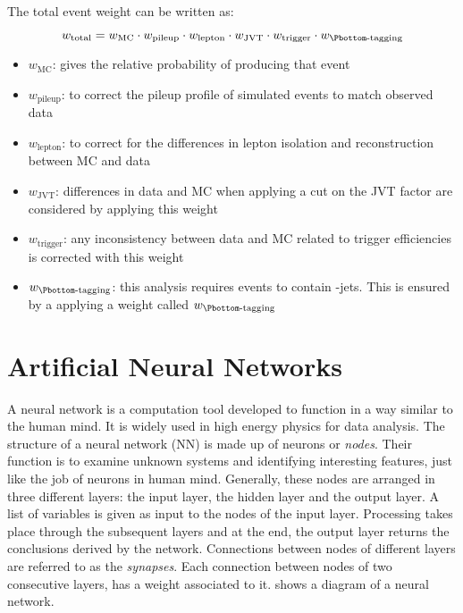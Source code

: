 The total event weight can be written as:

\begin{equation}
  w_{\text{total}} = w_{\text{MC}} \cdot w_{\text{pileup}} \cdot w_{\text{lepton}} \cdot w_{\text{JVT}} \cdot w_{\text{trigger}} \cdot w_{\text{\Pbottom-tagging}}
\end{equation}


\begin{itemize}
  \item $w_{\text{MC}}$: gives the relative probability of producing that event
  \item $w_\text{pileup}$: to correct the pileup profile of simulated events to match observed data
  \item $w_{\text{lepton}}$: to correct for the differences in lepton isolation and reconstruction between
  MC and data
  \item $w_{\text{JVT}}$: differences in data and MC when applying a cut on the JVT factor are considered
  by applying this weight
  \item $w_\text{trigger}$: any inconsistency between data and MC related to trigger efficiencies is
  corrected with this weight
  \item $w_\text{\Pbottom-tagging}$: this analysis requires events to contain \Pbottom-jets. This is 
  ensured by a applying a weight called $w_\text{\Pbottom-tagging}$
\end{itemize}


\section{Artificial Neural Networks}
A neural network is a computation tool developed to function in a way similar to the human mind. It is 
widely used in high energy physics for data analysis. The structure of a neural network (NN) is made 
up of neurons or \textit{nodes}. Their function is to examine unknown systems and identifying 
interesting features, just like the job of neurons in human mind. Generally, these nodes are arranged 
in three different layers: the input layer, the hidden layer and the output layer. A list of variables 
is given as input to the nodes of the input layer. Processing takes place through the subsequent 
layers and at the end, the output layer returns the conclusions derived by the network. Connections 
between nodes of different layers are referred to as the \textit{synapses}. Each connection between 
nodes of two consecutive layers, has a weight associated to it.  shows a diagram of a neural network. 

